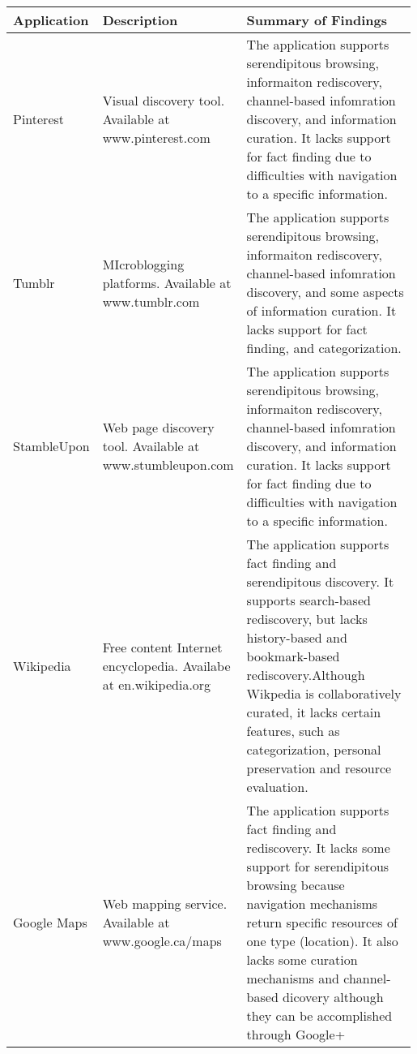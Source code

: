 \documentclass{casconpaper}
\begin{document}
{\begin{table*}[htbp]
\begin{tabular}{|p{0.11\linewidth}| p{0.22\linewidth}| p{0.66\linewidth}|}
\hline
Application     & Description                                                                  & Summary of Findings                                                                                                                                                                                                                                                                                            
\\
\hline
Pinterest       & Visual discovery tool. Available at www.pinterest.com                        & The application supports serendipitous browsing, informaiton rediscovery, channel-based infomration discovery, and information curation. It lacks support for fact finding due to difficulties with navigation to a specific information.                                                                       \\
\hline
Tumblr          & MIcroblogging platforms. Available at www.tumblr.com                         & The application supports serendipitous browsing, informaiton rediscovery, channel-based infomration discovery, and some aspects of information curation. It lacks support for fact finding, and categorization.                                                                                                 \\
\hline
StambleUpon     & Web page discovery tool. Available at www.stumbleupon.com                    & The application supports serendipitous browsing, informaiton rediscovery, channel-based infomration discovery, and information curation. It lacks support for fact finding due to difficulties with navigation to a specific information.                                                                       \\
\hline
Wikipedia       & Free content Internet encyclopedia. Availabe at en.wikipedia.org             & The application supports fact finding and serendipitous discovery. It supports search-based rediscovery, but lacks history-based and bookmark-based rediscovery.Although Wikpedia is collaboratively curated, it lacks certain features, such as categorization, personal preservation and resource evaluation. \\
\hline
Google Maps     & Web mapping service. Available at www.google.ca/maps                         & The application supports fact finding and rediscovery. It lacks some support for serendipitous browsing because navigation mechanisms return specific resources of one type (location).  It also lacks some curation mechanisms and channel-based dicovery although they can be accomplished through Google+    \\

\end{tabular}
\end{table*}}
\end{document}
